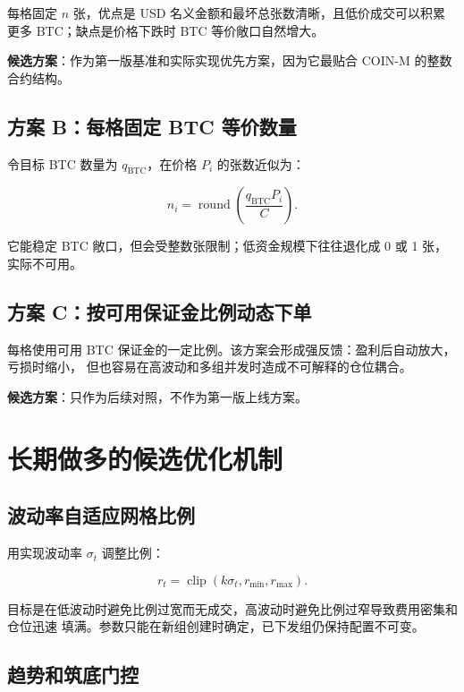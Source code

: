 \documentclass[11pt,a4paper,fontset=none]{ctexart}
\newcommand{\Candidate}{\textcolor{CoinGreen}{\textbf{候选方案}}}
\begin{document}
每格固定 $n$ 张，优点是 USD 名义金额和最坏总张数清晰，且低价成交可以积累更多
BTC；缺点是价格下跌时 BTC 等价敞口自然增大。

\Candidate：作为第一版基准和实际实现优先方案，因为它最贴合 COIN-M 的整数合约结构。

\subsection{方案 B：每格固定 BTC 等价数量}

令目标 BTC 数量为 $q_{\mathrm{BTC}}$，在价格 $P_i$ 的张数近似为：

\begin{equation}
  n_i=\operatorname{round}\left(\frac{q_{\mathrm{BTC}}P_i}{C}\right).
\end{equation}

它能稳定 BTC 敞口，但会受整数张限制；低资金规模下往往退化成 0 或 1 张，实际不可用。

\subsection{方案 C：按可用保证金比例动态下单}

每格使用可用 BTC 保证金的一定比例。该方案会形成强反馈：盈利后自动放大，亏损时缩小，
但也容易在高波动和多组并发时造成不可解释的仓位耦合。

\Candidate：只作为后续对照，不作为第一版上线方案。

\section{长期做多的候选优化机制}

\subsection{波动率自适应网格比例}

用实现波动率 $\sigma_t$ 调整比例：

\begin{equation}
  r_t=\operatorname{clip}(k\sigma_t,r_{\min},r_{\max}).
\end{equation}

目标是在低波动时避免比例过宽而无成交，高波动时避免比例过窄导致费用密集和仓位迅速
填满。参数只能在新组创建时确定，已下发组仍保持配置不可变。

\subsection{趋势和筑底门控}
\end{document}

